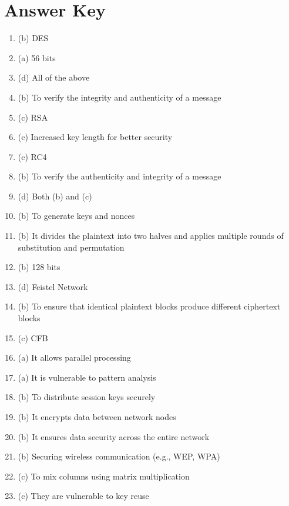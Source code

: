 \documentclass[12pt]{article}
\begin{document}
\section*{Answer Key}
\begin{enumerate}
    \item (b) DES
    \item (a) 56 bits
    \item (d) All of the above
    \item (b) To verify the integrity and authenticity of a message
    \item (c) RSA
    \item (c) Increased key length for better security
    \item (c) RC4
    \item (b) To verify the authenticity and integrity of a message
    \item (d) Both (b) and (c)
    \item (b) To generate keys and nonces
    \item (b) It divides the plaintext into two halves and applies multiple rounds of substitution and permutation
    \item (b) 128 bits
    \item (d) Feistel Network
    \item (b) To ensure that identical plaintext blocks produce different ciphertext blocks
    \item (c) CFB
    \item (a) It allows parallel processing
    \item (a) It is vulnerable to pattern analysis
    \item (b) To distribute session keys securely
    \item (b) It encrypts data between network nodes
    \item (b) It ensures data security across the entire network
    \item (b) Securing wireless communication (e.g., WEP, WPA)
    \item (c) To mix columns using matrix multiplication
    \item (c) They are vulnerable to key reuse
\end{enumerate}
\end{document}
